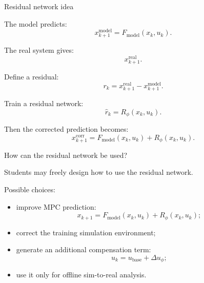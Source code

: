 \documentclass[aspectratio=169]{beamer}
\begin{document}
\begin{frame}{Residual network idea}

The model predicts:
\[
x_{k+1}^{\mathrm{model}}
=
F_{\mathrm{model}}(x_k,u_k).
\]

The real system gives:
\[
x_{k+1}^{\mathrm{real}}.
\]

Define a residual:
\[
r_k
=
x_{k+1}^{\mathrm{real}}
-
x_{k+1}^{\mathrm{model}}.
\]

\vspace{0.12cm}

Train a residual network:
\[
\hat{r}_k
=
R_\phi(x_k,u_k).
\]

Then the corrected prediction becomes:
\[
x_{k+1}^{\mathrm{corr}}
=
F_{\mathrm{model}}(x_k,u_k)+R_\phi(x_k,u_k).
\]

\end{frame}

\begin{frame}{How can the residual network be used?}

Students may freely design how to use the residual network.



Possible choices:
\begin{itemize}
    \item improve MPC prediction:
    \[
    x_{k+1}=F_{\mathrm{model}}(x_k,u_k)+R_\phi(x_k,u_k);
    \]

    \item correct the training simulation environment;

    \item generate an additional compensation term:
    \[
    u_k=u_{\mathrm{base}}+\Delta u_\phi;
    \]

    \item use it only for offline sim-to-real analysis.
\end{itemize}


\end{frame}
\end{document}
